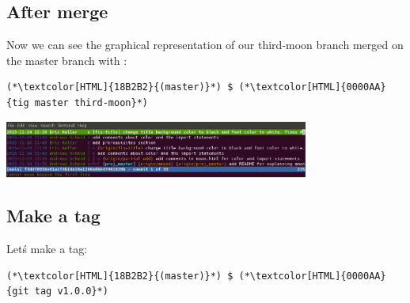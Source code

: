 \subsection{After merge}
\begin{frame}[fragile]
  \subslidetitle

  Now we can see the graphical representation of our third-moon branch merged on the master branch with :
  \begin{lstlisting}
(*\textcolor[HTML]{18B2B2}{(master)}*) $ (*\textcolor[HTML]{0000AA}{tig master third-moon}*)
\end{lstlisting}

  \vspace{1em}

  \centerline{\includegraphics[width=10cm]{../screen/tig-fix-title-rebase-master.png}}

\end{frame}

\subsection{Make a tag}
\begin{frame}[fragile]
  \subslidetitle

  Let\'s make a tag:
  \begin{lstlisting}
(*\textcolor[HTML]{18B2B2}{(master)}*) $ (*\textcolor[HTML]{0000AA}{git tag v1.0.0}*)
\end{lstlisting}

\end{frame}


